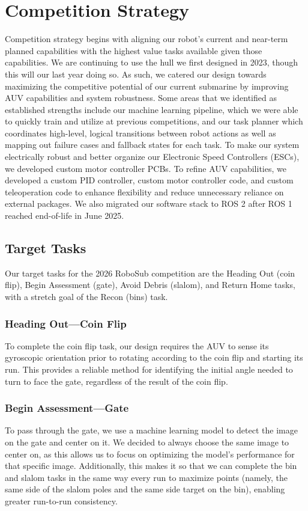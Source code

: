 \documentclass[conference]{IEEEtran}
\begin{document}
\section{Competition Strategy} \label{sec:comp_strat}
Competition strategy begins with aligning our robot's current and near-term planned capabilities with the highest value tasks available given those capabilities. We are continuing to use the hull we first designed in 2023, though this will our last year doing so. As such, we catered our design towards maximizing the competitive potential of our current submarine by improving AUV capabilities and system robustness. Some areas that we identified as established strengths include our machine learning pipeline, which we were able to quickly train and utilize at previous competitions, and our task planner which coordinates high-level, logical transitions between robot actions as well as mapping out failure cases and fallback states for each task. To make our system electrically robust and better organize our Electronic Speed Controllers (ESCs), we developed custom motor controller PCBs. To refine AUV capabilities, we developed a custom PID controller, custom motor controller code, and custom teleoperation code to enhance flexibility and reduce unnecessary reliance on external packages. We also migrated our software stack to ROS 2 \cite{b6} after ROS 1 reached end-of-life in June 2025.

\subsection{Target Tasks} \label{ssec:target_goals}
Our target tasks for the 2026 RoboSub competition are the Heading Out (coin flip), Begin Assessment (gate), Avoid Debris (slalom), and Return Home tasks, with a stretch goal of the Recon (bins) task.

\subsubsection{Heading Out---Coin Flip}
\label{sssec:coin_flip_task}
To complete the coin flip task, our design requires the AUV to sense its gyroscopic orientation prior to rotating according to the coin flip and starting its run. This provides a reliable method for identifying the initial angle needed to turn to face the gate, regardless of the result of the coin flip. 


\subsubsection{Begin Assessment---Gate}
\label{sssec:gate_task}
To pass through the gate, we use a machine learning model to detect the image on the gate and center on it. We decided to always choose the same image to center on, as this allows us to focus on optimizing the model’s performance for that specific image. Additionally, this makes it so that we can complete the bin and slalom tasks in the same way every run to maximize points (namely, the same side of the slalom poles and the same side target on the bin), enabling greater run-to-run consistency.
\end{document}
